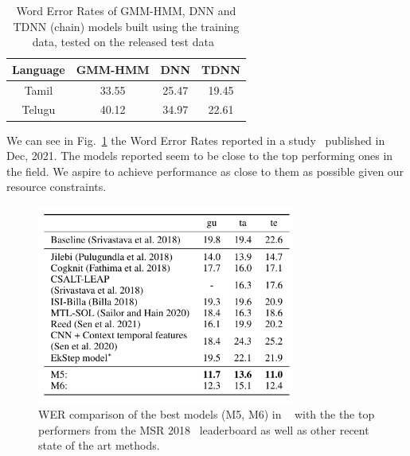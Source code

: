 \documentclass[11pt]{article} \usepackage{spconf,amsmath,graphicx}
\begin{document}
\begin{table}[h]
\begin{center}
\begin{tabular}[width=5cm]{ |c|c|c|c| } 

\hline Language & GMM-HMM  & DNN & TDNN\\ \hline

Tamil & 33.55 & 25.47 & 19.45    \\  \hline

Telugu & 40.12 & 34.97 & 22.61    \\  \hline




\end{tabular}

\caption{Word Error Rates of GMM-HMM, DNN and TDNN (chain) models built using the training data,
tested on the released test data~\cite{srivastava2018interspeech}}
\label{tab:kaldibaseline} \end{center} \end{table}

We can see in Fig.~\ref{fig:soa} the Word Error Rates reported in a study~\cite{javed2021towards} published in Dec, 2021. The models reported seem to be close to the top
performing ones in the field. We aspire to achieve performance as close to them as possible given our resource constraints.

\begin{figure}[h]
\includegraphics[width=8.5cm]{stateoftheart.png} \caption{WER comparison of the best models (M5, M6) in ~\cite{javed2021towards} with the
the top performers from the MSR 2018~\cite{srivastava2018interspeech} leaderboard as well
as other recent state of the art methods.} \label{fig:soa}
\end{figure}
\end{document}
